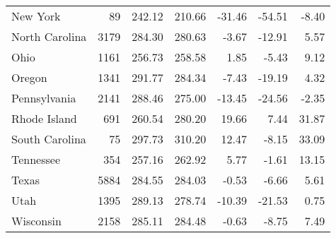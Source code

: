 \begin{table}[ht]
\begin{center}
\begin{tabular}{lrrrrrr}
  New York &  89 & 242.12 & 210.66 & -31.46 & -54.51 & -8.40 \\ 
  North Carolina & 3179 & 284.30 & 280.63 & -3.67 & -12.91 & 5.57 \\ 
  Ohio & 1161 & 256.73 & 258.58 & 1.85 & -5.43 & 9.12 \\ 
  Oregon & 1341 & 291.77 & 284.34 & -7.43 & -19.19 & 4.32 \\ 
  Pennsylvania & 2141 & 288.46 & 275.00 & -13.45 & -24.56 & -2.35 \\ 
  Rhode Island & 691 & 260.54 & 280.20 & 19.66 & 7.44 & 31.87 \\ 
  South Carolina &  75 & 297.73 & 310.20 & 12.47 & -8.15 & 33.09 \\ 
  Tennessee & 354 & 257.16 & 262.92 & 5.77 & -1.61 & 13.15 \\ 
  Texas & 5884 & 284.55 & 284.03 & -0.53 & -6.66 & 5.61 \\ 
  Utah & 1395 & 289.13 & 278.74 & -10.39 & -21.53 & 0.75 \\ 
  Wisconsin & 2158 & 285.11 & 284.48 & -0.63 & -8.75 & 7.49 \\ 
   \hline
\end{tabular}
\end{center}
\end{table}
